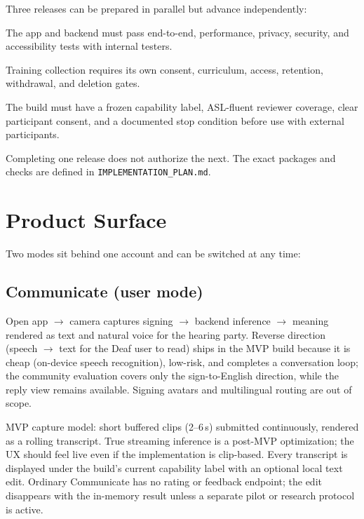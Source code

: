 \documentclass[11pt]{article}
\newcommand{\code}[1]{\texttt{#1}}
\begin{document}
Three releases can be prepared in parallel but advance independently:

\begin{description}[nosep]
  \item[Internal vertical slice.] The app and backend must pass end-to-end,
        performance, privacy, security, and accessibility tests with internal
        testers.
  \item[Contribution build.] Training collection requires its own consent,
        curriculum, access, retention, withdrawal, and deletion gates.
  \item[Closed pilot.] The build must have a frozen capability label,
        ASL-fluent reviewer coverage, clear participant consent, and a documented
        stop condition before use with external participants.
\end{description}

Completing one release does not authorize the next. The exact packages and checks are
defined in \code{IMPLEMENTATION\_PLAN.md}.

\section{Product Surface}

Two modes sit behind one account and can be switched at any time:

\subsection{Communicate (user mode)}
Open app $\to$ camera captures signing $\to$ backend inference $\to$ meaning rendered
as text and natural voice for the hearing party. Reverse direction (speech $\to$ text
for the Deaf user to read) ships in the MVP build because it is cheap (on-device
speech recognition), low-risk, and completes a conversation loop; the community
evaluation covers only the sign-to-English direction, while the reply view remains
available. Signing avatars and multilingual routing are out of scope.

MVP capture model: short buffered clips (2--6\,s) submitted continuously, rendered as
a rolling transcript. True streaming inference is a post-MVP optimization; the UX
should feel live even if the implementation is clip-based.
Every transcript is displayed under the build's current capability label with an
optional local text edit. Ordinary Communicate has no rating or feedback endpoint;
the edit disappears with the in-memory result unless a separate pilot or research
protocol is active.
\end{document}
